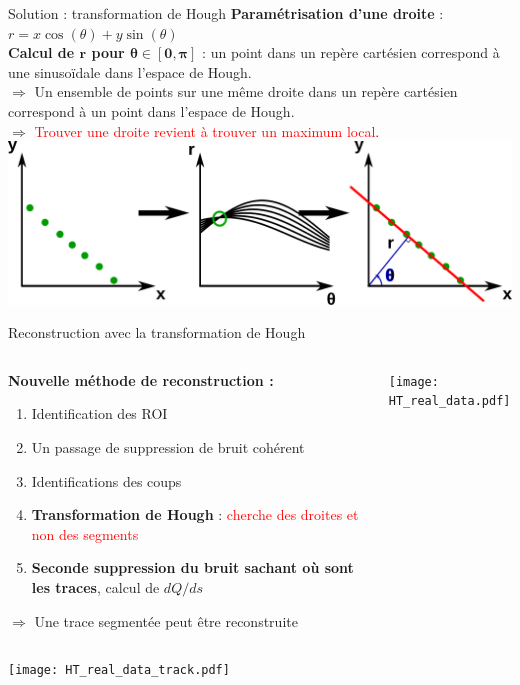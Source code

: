     \begin{frame}{Solution : transformation de Hough}
        \textbf{Paramétrisation d'une droite }: $r=x\cos(\theta)+y\sin(\theta)$\\
        \textbf{Calcul de $\boldsymbol{r}$ pour $\boldsymbol{\theta\in[0,\pi]}$} : un point dans un repère cartésien correspond à une sinusoïdale dans l'espace de Hough.\\
        $\Rightarrow$ Un ensemble de points sur une même droite dans un repère cartésien correspond à un point dans l'espace de Hough.\\
        $\Rightarrow$ \textcolor{red}{Trouver une droite revient à trouver un maximum local}.\\\vfill
        \includegraphics[width=\textwidth]{./pictures/HT.pdf}
    \end{frame}

    \begin{frame}{Reconstruction avec la transformation de Hough}
        \begin{scriptsize}
            \begin{columns}
                \begin{column}{0.5\textwidth}
                    \textbf{Nouvelle méthode de reconstruction :}
                    \begin{enumerate}
                        \item Identification des ROI
                        \item Un passage de suppression de bruit cohérent
                        \item Identifications des coups
                        \item \textbf{Transformation de Hough} : \textcolor{red}{cherche des droites et non des segments}
                        \item \textbf{Seconde suppression du bruit sachant où sont les traces}, calcul de $dQ/ds$
                    \end{enumerate}
                    $\Rightarrow$ Une trace segmentée peut être reconstruite
                \end{column}
                \begin{column}{0.5\textwidth}
                    \centering \texttt{[image: HT\_real\_data.pdf]}
                \end{column}
            \end{columns}
            \begin{center} \texttt{[image: HT\_real\_data\_track.pdf]} \end{center}
        \end{scriptsize}
    \end{frame}

